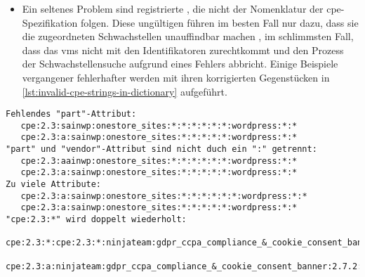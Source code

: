 \begin{itemize}
    \item Ein seltenes Problem sind registrierte , die nicht der Nomenklatur der \acrshort{cpe}-Spezifikation folgen.
    Diese ungültigen  führen im besten Fall nur dazu, dass sie die zugeordneten Schwachstellen unauffindbar machen \autocite{Takahashi_Miyamoto_Nakao_2016}, im schlimmsten Fall, dass das \acrshort{vms} nicht mit den Identifikatoren zurechtkommt und den Prozess der Schwachstellensuche aufgrund eines Fehlers abbricht.
    Einige Beispiele vergangener fehlerhafter  werden mit ihren korrigierten Gegenstücken in \autoref{lst:invalid-cpe-strings-in-dictionary} aufgeführt.
\end{itemize}

\begin{lstlisting}[caption=Ungültige CPE aus dem CPE Dictionary und ihre korrigierten Gegenstücke,label=lst:invalid-cpe-strings-in-dictionary]
Fehlendes "part"-Attribut:
   cpe:2.3:sainwp:onestore_sites:*:*:*:*:*:*:wordpress:*:*
   cpe:2.3:a:sainwp:onestore_sites:*:*:*:*:*:wordpress:*:*
"part" und "vendor"-Attribut sind nicht duch ein ":" getrennt:
   cpe:2.3:aainwp:onestore_sites:*:*:*:*:*:*:wordpress:*:*
   cpe:2.3:a:sainwp:onestore_sites:*:*:*:*:*:wordpress:*:*
Zu viele Attribute:
   cpe:2.3:a:sainwp:onestore_sites:*:*:*:*:*:*:wordpress:*:*
   cpe:2.3:a:sainwp:onestore_sites:*:*:*:*:*:wordpress:*:*
"cpe:2.3:*" wird doppelt wiederholt:
   cpe:2.3:*:cpe:2.3:*:ninjateam:gdpr_ccpa_compliance_&_cookie_consent_banner:2.7.2:*:*:*:*:wordpress:*:*
   cpe:2.3:a:ninjateam:gdpr_ccpa_compliance_&_cookie_consent_banner:2.7.2:*:*:*:*:wordpress:*:*
\end{lstlisting}


